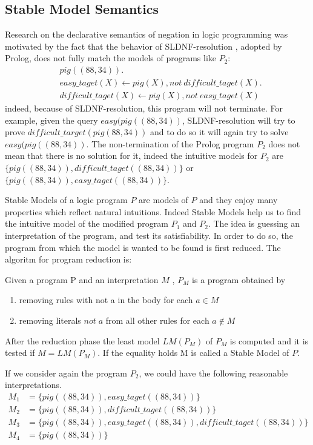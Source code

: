 \subsection{Stable Model Semantics}
Research on the declarative semantics of negation in logic programming was motivated by the fact that the behavior of SLDNF-resolution \cite{}, adopted by Prolog,  does not fully match the models of programs like \(P_2\):
\begin{align}
&pig((88,34)). \\
&easy\_taget(X) \leftarrow pig(X), not\: difficult\_taget(X). \\ 
&difficult\_taget(X) \leftarrow pig(X), not\: easy\_taget(X) 
\end{align}
indeed, because of SLDNF-resolution, this program will not terminate. For example, given the query \(easy(pig((88,34))\), SLDNF-resolution will try to prove \(difficult\_target(pig(88,34))\) and to do so it will again try to solve \(easy(pig((88,34))\).
The non-termination of the Prolog program \(P_2\) does not mean that there is no solution for it, indeed the intuitive models for \(P_2\) are \(\{pig((88,34)), difficult\_taget((88,34))\}\) or  \(\{pig((88,34)), easy\_taget((88,34))\}\).

Stable Models of a logic program \(P\) are models of \(P\) and they enjoy many properties which reflect natural intuitions.
Indeed  Stable Models help us to find the intuitive model of the modified program \(P_1\) and \(P_2\). The idea is guessing an interpretation of the program, and test its satisfiability. In order to do so, the program from which the model is wanted to be found is first reduced. The algoritm for program reduction is:

Given a program P and an interpretation \(M\) , \(P_M\) is a program obtained by 
\begin{enumerate} 
\item removing rules with not a in the body for each \(a \in M\)
\item removing literals \(not\; a\) from all other rules for each \(a \notin M\)
\end{enumerate}
After the reduction phase the least model \(LM(P_M)\) of \(P_M\) is computed and it is tested if \(M = LM(P_M)\). If the equality holds M is called a Stable Model of \(P\).

If we consider again the program \(P_2\), we could have the following reasonable interpretations.
\begin{align*}
M_1&= \{pig((88,34)), easy\_taget((88,34))\}  \\
M_2&= \{pig((88,34)), difficult\_taget((88,34))\} \\
M_3&= \{pig((88,34)), easy\_taget((88,34)), difficult\_taget((88,34))\} \\
M_4&= \{pig((88,34))\}
\end{align*}

